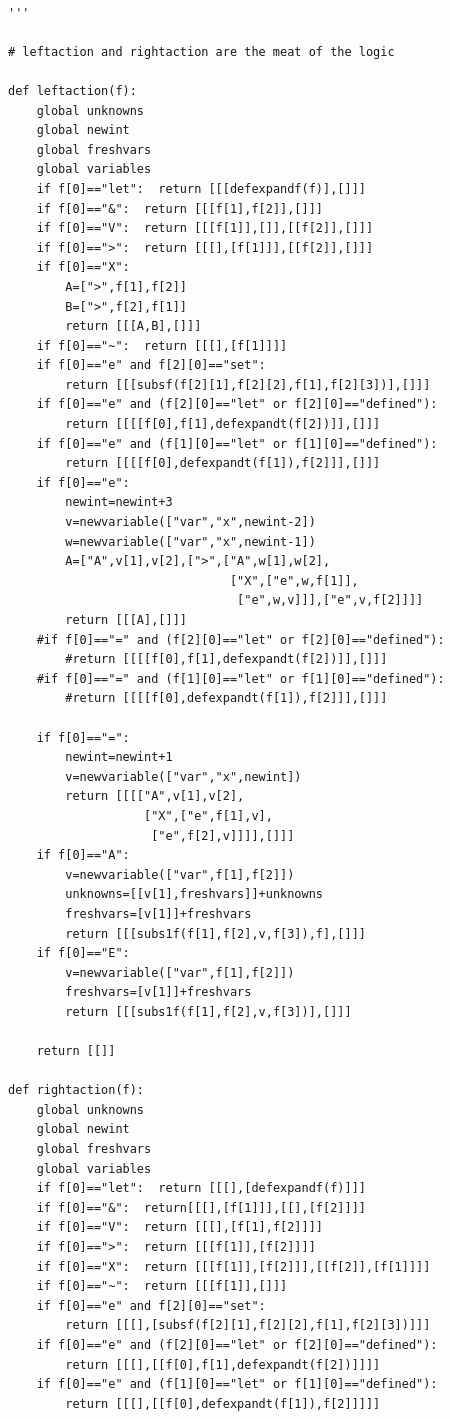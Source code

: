 \documentclass{article}
\begin{document}
\begin{verbatim}

'''

# leftaction and rightaction are the meat of the logic

def leftaction(f):
    global unknowns
    global newint
    global freshvars
    global variables
    if f[0]=="let":  return [[[defexpandf(f)],[]]]
    if f[0]=="&":  return [[[f[1],f[2]],[]]]
    if f[0]=="V":  return [[[f[1]],[]],[[f[2]],[]]]
    if f[0]==">":  return [[[],[f[1]]],[[f[2]],[]]]
    if f[0]=="X":
        A=[">",f[1],f[2]]
        B=[">",f[2],f[1]]
        return [[[A,B],[]]]
    if f[0]=="~":  return [[[],[f[1]]]]
    if f[0]=="e" and f[2][0]=="set":
        return [[[subsf(f[2][1],f[2][2],f[1],f[2][3])],[]]]
    if f[0]=="e" and (f[2][0]=="let" or f[2][0]=="defined"):
        return [[[[f[0],f[1],defexpandt(f[2])]],[]]]
    if f[0]=="e" and (f[1][0]=="let" or f[1][0]=="defined"):
        return [[[[f[0],defexpandt(f[1]),f[2]]],[]]]
    if f[0]=="e":
        newint=newint+3
        v=newvariable(["var","x",newint-2])
        w=newvariable(["var","x",newint-1])
        A=["A",v[1],v[2],[">",["A",w[1],w[2],
                               ["X",["e",w,f[1]],
                                ["e",w,v]]],["e",v,f[2]]]]
        return [[[A],[]]]   
    #if f[0]=="=" and (f[2][0]=="let" or f[2][0]=="defined"):
        #return [[[[f[0],f[1],defexpandt(f[2])]],[]]]
    #if f[0]=="=" and (f[1][0]=="let" or f[1][0]=="defined"):
        #return [[[[f[0],defexpandt(f[1]),f[2]]],[]]]
         
    if f[0]=="=":
        newint=newint+1
        v=newvariable(["var","x",newint])
        return [[[["A",v[1],v[2],
                   ["X",["e",f[1],v],
                    ["e",f[2],v]]]],[]]]
    if f[0]=="A":
        v=newvariable(["var",f[1],f[2]])
        unknowns=[[v[1],freshvars]]+unknowns
        freshvars=[v[1]]+freshvars
        return [[[subs1f(f[1],f[2],v,f[3]),f],[]]]
    if f[0]=="E":
        v=newvariable(["var",f[1],f[2]])
        freshvars=[v[1]]+freshvars
        return [[[subs1f(f[1],f[2],v,f[3])],[]]]

    return [[]]

def rightaction(f):
    global unknowns
    global newint
    global freshvars
    global variables
    if f[0]=="let":  return [[[],[defexpandf(f)]]]
    if f[0]=="&":  return[[[],[f[1]]],[[],[f[2]]]]
    if f[0]=="V":  return [[[],[f[1],f[2]]]]
    if f[0]==">":  return [[[f[1]],[f[2]]]]
    if f[0]=="X":  return [[[f[1]],[f[2]]],[[f[2]],[f[1]]]]
    if f[0]=="~":  return [[[f[1]],[]]]
    if f[0]=="e" and f[2][0]=="set":
        return [[[],[subsf(f[2][1],f[2][2],f[1],f[2][3])]]]
    if f[0]=="e" and (f[2][0]=="let" or f[2][0]=="defined"):
        return [[[],[[f[0],f[1],defexpandt(f[2])]]]]
    if f[0]=="e" and (f[1][0]=="let" or f[1][0]=="defined"):
        return [[[],[[f[0],defexpandt(f[1]),f[2]]]]]



\end{verbatim}
\end{document}
